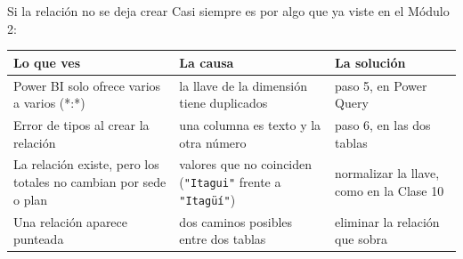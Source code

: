 \documentclass[aspectratio=169,11pt]{beamer}
\begin{document}
\begin{frame}[t]{Si la relación no se deja crear}
  \small
  Casi siempre es por algo que ya viste en el Módulo 2:
  \vspace{0.15cm}

  \footnotesize
  \renewcommand{\arraystretch}{1.2}
  \begin{tabular}{@{}L{4.0cm}L{4.9cm}L{3.9cm}@{}}
    \toprule
    \textbf{Lo que ves} & \textbf{La causa} & \textbf{La solución} \\
    \midrule
    Power BI solo ofrece varios a varios (*:*) & la llave de la dimensión tiene duplicados & paso 5, en Power Query \\
    Error de tipos al crear la relación & una columna es texto y la otra número & paso 6, en las dos tablas \\
    La relación existe, pero los totales no cambian por sede o plan & valores que no coinciden (\texttt{"Itagui"} frente a \texttt{"Itagüí"}) & normalizar la llave, como en la Clase 10 \\
    Una relación aparece punteada & dos caminos posibles entre dos tablas & eliminar la relación que sobra \\
    \bottomrule
  \end{tabular}
\end{frame}
\end{document}
